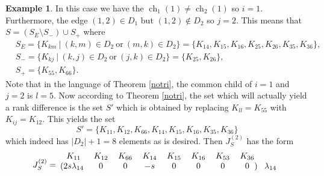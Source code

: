 \documentclass[12pt,reqno]{amsart}
\theoremstyle{plain}
\theoremstyle{definition}
\newtheorem{example}[theorem]{Example}
\DeclareMathOperator{\ch}{ch}
\begin{document}
\begin{example}
In this case we have the $\ch_1(1) \neq \ch_2(1)$ so $i = 1$. Furthermore, the edge $(1, 2) \in D_1$ but $(1,2) \notin D_2$ so $j = 2$. This means that $S = (S_E \setminus S_-) \cup S_+$ where
\begin{align*}
&S_E = \{K_{km} ~|~ (k, m) \in D_2 ~\mathrm{or}~ (m, k) \in D_2\} 
= \{K_{14}, K_{15}, K_{16}, K_{25}, K_{26}, K_{35}, K_{36}\}, \\
&S_- = \{K_{kj} ~|~ (k, j) \in D_2 ~\mathrm{or}~ (j, k) \in D_2\} 
= \{K_{25}, K_{26}\},\\
&S_+ = \{K_{55}, K_{66}\}. 
\end{align*}
Note that in the language of Theorem \ref{notri}, the common child of $i=1$ and $j=2$ is $l = 5$.   Now according to Theorem \ref{notri}, the set which will actually yield a rank difference is the set $S'$ which is obtained by replacing $K_{ll} = K_{55}$ with $K_{ij} = K_{12}$. This yields the set
\[
S' = \{K_{11}, K_{12}, K_{66}, K_{14}, K_{15}, K_{16}, K_{35}, K_{36}\}
\]
which indeed has $|D_2|+1 = 8$ elements as is desired. Then $J_S^{(2)}$ has the form
\begin{equation*}
J_S^{(2)}=
\begin{blockarray}{ccccccccc}
K_{11} & K_{12} & K_{66} & K_{14} & K_{15} & K_{16} & K_{53} & K_{36} \\
\begin{block}{(cccccccc)c}
2s\lambda_{14}& 0& 0& -s& 0& 0& 0& 0 & \lambda_{14} \\

\end{block}
\end{blockarray}
\end{equation*}
\end{example}
\end{document}
